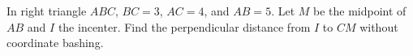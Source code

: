 In right triangle $ABC$, $BC=3$, $AC=4$, and $AB=5$. Let $M$ be the midpoint of $AB$ and $I$ the incenter. Find the perpendicular distance from $I$ to $CM$ without coordinate bashing.

